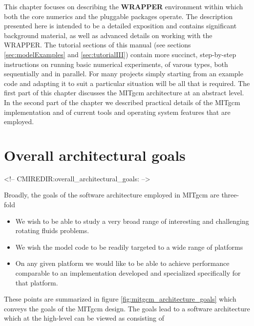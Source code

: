 
This chapter focuses on describing the {\bf WRAPPER} environment
within which both the core numerics and the pluggable packages
operate. The description presented here is intended to be a detailed
exposition and contains significant background material, as well as
advanced details on working with the WRAPPER.  The tutorial sections
of this manual (see sections \ref{sec:modelExamples} and
\ref{sec:tutorialIII}) contain more succinct, step-by-step
instructions on running basic numerical experiments, of varous types,
both sequentially and in parallel. For many projects simply starting
from an example code and adapting it to suit a particular situation
will be all that is required.  The first part of this chapter
discusses the MITgcm architecture at an abstract level. In the second
part of the chapter we described practical details of the MITgcm
implementation and of current tools and operating system features that
are employed.

\section{Overall architectural goals}
\begin{rawhtml}
<!-- CMIREDIR:overall_architectural_goals: -->
\end{rawhtml}

Broadly, the goals of the software architecture employed in MITgcm are 
three-fold
 
\begin{itemize}
\item We wish to be able to study a very broad range of interesting
  and challenging rotating fluids problems.
\item We wish the model code to be readily targeted to a wide range of
  platforms
\item On any given platform we would like to be able to achieve
  performance comparable to an implementation developed and
  specialized specifically for that platform.
\end{itemize}

These points are summarized in figure
\ref{fig:mitgcm_architecture_goals} which conveys the goals of the
MITgcm design. The goals lead to a software architecture which at the
high-level can be viewed as consisting of

